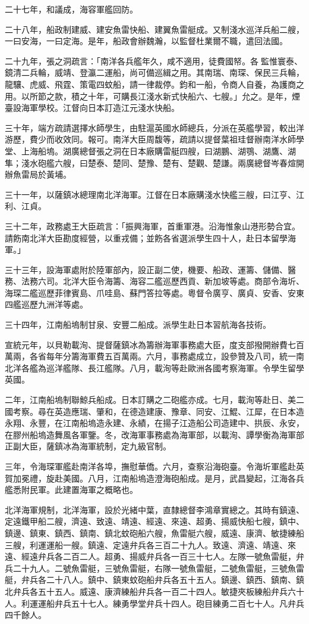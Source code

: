 \begin{pinyinscope}
二十七年，和議成，海容軍艦回防。

二十八年，船政制建威、建安魚雷快船、建翼魚雷艇成。又制淺水巡洋兵船二艘，一曰安海，一曰定海。是年，船政會辦魏瀚，以監督杜業爾不職，遣回法國。

二十九年，張之洞疏言：「南洋各兵艦年久，咸不適用，徒費國帑。各監惟寰泰、鏡清二兵輪，威靖、登瀛二運船，尚可備巡緝之用。其南瑞、南琛、保民三兵輪，龍驤、虎威、飛霆、策電四蚊船，請一律裁停。鈞和一船，令商人自養，為護商之用。以所節之款，積之十年，可購長江淺水新式快船六、七艘。」允之。是年，煙臺設海軍學校。江督向日本訂造江元淺水快船。

三十年，端方疏請選擇水師學生，由駐滬英國水師總兵，分派在英艦學習，較出洋游歷，費少而收效同。報可。南洋大臣周馥等，疏請以提督葉祖珪督辦南洋水師學堂、上海船塢。湖廣總督張之洞在日本廠購雷艇四艘，曰湖鵬、湖鶚、湖鷹、湖隼；淺水砲艦六艘，曰楚泰、楚同、楚豫、楚有、楚觀、楚謙。兩廣總督岑春煊開辦魚雷局於黃埔。

三十一年，以薩鎮冰總理南北洋海軍。江督在日本廠購淺水快艦三艘，曰江亨、江利、江貞。

三十二年，政務處王大臣疏言：「振興海軍，首重軍港。沿海惟象山港形勢合宜。請飭南北洋大臣勘度經營，以重戎備；並飭各省選派學生四十人，赴日本留學海軍。」

三十三年，設海軍處附於陸軍部內，設正副二使，機要、船政、運籌、儲備、醫務、法務六司。北洋大臣令海籌、海容二艦巡歷西貢、新加坡等處。商部令海圻、海琛二艦巡歷菲律賓島、爪哇島、蘇門答拉等處。粵督令廣亨、廣貞、安香、安東四艦巡歷九洲洋等處。

三十四年，江南船塢制甘泉、安豐二船成。派學生赴日本習航海各技術。

宣統元年，以貝勒載洵、提督薩鎮冰為籌辦海軍事務處大臣，度支部撥開辦費七百萬兩，各省每年分籌海軍費五百萬兩。六月，事務處成立，設參贊及八司，統一南北洋各艦為巡洋艦隊、長江艦隊。八月，載洵等赴歐洲各國考察海軍。令學生留學英國。

二年，江南船塢制聯鯨兵船成。日本訂購之二砲艦亦成。七月，載洵等赴日、美二國考察。尋在英造應瑞、肇和，在德造建康、豫章、同安、江鯤、江犀，在日本造永翔、永豐，在江南船塢造永建、永績，在揚子江造船公司造建中、拱辰、永安，在膠州船塢造舞風各軍鑒。冬，改海軍事務處為海軍部，以載洵、譚學衡為海軍部正副大臣，薩鎮冰為海軍統制，定九級官制。

三年，令海琛軍艦赴南洋各埠，撫慰華僑。六月，查察沿海砲臺。令海圻軍艦赴英賀加冕禮，旋赴美國。八月，江南船塢造澄海砲船成。是月，武昌變起，江海各兵艦悉附民軍。此建置海軍之概略也。

北洋海軍規制，北洋海軍，設於光緒中葉，直隸總督李鴻章實總之。其時有鎮遠、定遠鐵甲船二艘，濟遠、致遠、靖遠、經遠、來遠、超勇、揚威快船七艘，鎮中、鎮邊、鎮東、鎮西、鎮南、鎮北蚊砲船六艘，魚雷艇六艘，威遠、康濟、敏捷練船三艘，利運運船一艘。鎮遠、定遠弁兵各三百二十九人。致遠、濟遠、靖遠、來遠、經遠弁兵各二百二人。超勇、揚威弁兵各一百三十七人。左隊一號魚雷艇，弁兵二十九人。二號魚雷艇，三號魚雷艇，右隊一號魚雷艇，二號魚雷艇，三號魚雷艇，弁兵各二十八人。鎮中、鎮東蚊砲船弁兵各五十五人。鎮邊、鎮西、鎮南、鎮北弁兵各五十五人。威遠、康濟練船弁兵各一百二十四人。敏捷夾板練船弁兵六十人。利運運船弁兵五十七人。練勇學堂弁兵十四人。砲目練勇二百七十人。凡弁兵四千餘人。


\end{pinyinscope}
